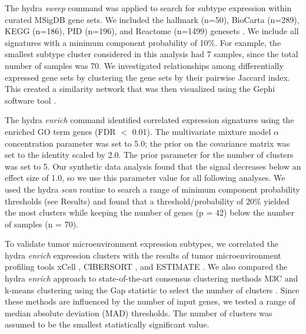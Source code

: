 \documentclass[10pt,letterpaper]{article}
\begin{document}
The hydra \textit{sweep} command was applied to search for subtype expression within curated MSigDB gene sets. We included the hallmark (n=50), BioCarta (n=289), KEGG (n=186), PID (n=196), and Reactome (n=1499) genesets \cite{liberzonMolecularSignaturesDatabase2011}. We include all signatures with a minimum component probability of 10\%. For example, the smallest subtype cluster considered in this analysis had 7 samples, since the total number of samples was 70. We investigated relationships among differentially expressed gene sets by clustering the gene sets by their pairwise Jaccard index. This created a similarity network that was then visualized using the Gephi software tool \cite{bastian2009gephi}.

The hydra \textit{enrich} command identified correlated expression signatures using the enriched GO term genes (FDR $<$ 0.01). The multivariate mixture model $\alpha$ concentration parameter was set to 5.0; the prior on the covariance matrix was set to the identity scaled by 2.0. The prior parameter for the number of clusters was set to 5. Our synthetic data analysis found that the signal decreases below an effect size of 1.0, so we use this parameter value for all following analyses. We used the hydra \textit{scan} routine to search a range of minimum component probability thresholds (see Results) and found that a threshold/probability of 20\% yielded the most clusters while keeping the number of genes (p = 42) below the number of samples (n = 70).

To validate tumor microenvironment expression subtypes, we correlated the hydra \textit{enrich} expression clusters with the results of tumor microenvironment profiling tools xCell \cite{aranXCellDigitallyPortraying2017}, CIBERSORT \cite{newmanRobustEnumerationCell2015}, and ESTIMATE \cite{yoshiharaInferringTumourPurity2013a}. We also compared the hydra \textit{enrich} approach to state-of-the-art consensus clustering methods M3C \cite{johnM3CMonteCarlo2018} and k-means clustering using the Gap statistic to select the number of clusters \cite{tibshirani2001estimating}. Since these methods are influenced by the number of input genes, we tested a range of median absolute deviation (MAD) thresholds. The number of clusters was assumed to be the smallest statistically significant value.
\end{document}
